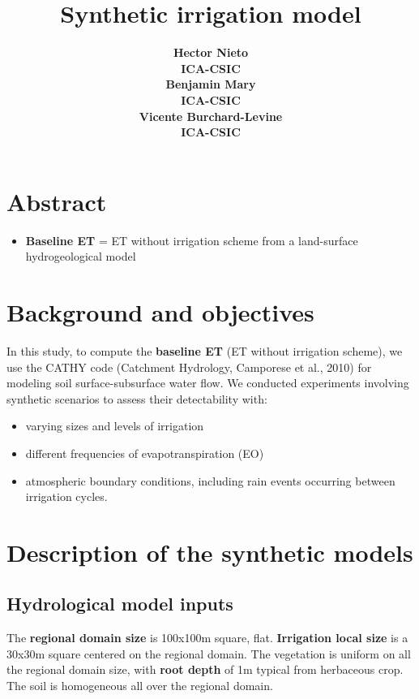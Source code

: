 \documentclass{article}
\title{Synthetic irrigation model}
\date{\displaydate{articleDate}}
\author{\bfseries Hector Nieto\mdseries\\ICA-CSIC\\\AND\bfseries Benjamin Mary\mdseries\\ICA-CSIC\\\AND\bfseries Vicente Burchard-Levine\mdseries\\ICA-CSIC\\}
\begin{document}
\maketitle
{}

\section{Abstract}

\begin{itemize}
\item \textbf{Baseline ET} = ET without irrigation scheme from a land-surface hydrogeological model
\end{itemize}

\section{Background and objectives}

In this study, to compute the \textbf{baseline ET} (ET without irrigation scheme), we use the CATHY code (Catchment Hydrology, Camporese et al., 2010) for modeling soil surface-subsurface water flow. We conducted experiments involving synthetic scenarios to assess their detectability with:

\begin{itemize}
\item varying sizes and levels of irrigation
\item different frequencies of evapotranspiration (EO)
\item atmospheric boundary conditions, including rain events occurring between irrigation cycles.
\end{itemize}

\section{Description of the synthetic models}

\subsection{Hydrological model inputs}

The \textbf{regional domain size} is 100x100m square, flat. \textbf{Irrigation local size} is a 30x30m square centered on the regional domain.
The vegetation is uniform on all the regional domain size, with \textbf{root depth} of 1m typical from herbaceous crop.
The soil is homogeneous all over the regional domain.
\end{document}
